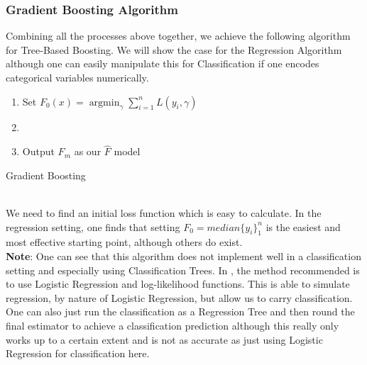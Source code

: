 \documentclass[11pt,a4paper]{report}
\DeclareMathOperator*{\argminB}{argmin}
\begin{document}
\subsubsection{Gradient Boosting Algorithm}
Combining all the processes above together, we achieve the following algorithm for Tree-Based Boosting. 
We will show the case for the Regression Algorithm although one can easily manipulate this for Classification if one encodes categorical variables numerically.
\begin{algorithm}
\SetAlgoLined
\begin{enumerate}
    \item Set $F_0 (x) = \argminB_\gamma \sum_{i=1}^{n} L(y_i, \gamma)$
    
    \item {}
    
    \item Output $F_m$ as our $\hat{F}$ model
\end{enumerate}
\caption{Gradient Boosting}
\end{algorithm}\\
We need to find an initial loss function which is easy to calculate. 
In the regression setting, one finds that setting $F_0 = median \{y_i\}_{1}^{n}$ is the easiest and most effective starting point, although others do exist.
\medskip\\
\textbf{Note}: One can see that this algorithm does not implement well in a classification setting and especially using Classification Trees.
In \cite{gbm}, the method recommended is to use Logistic Regression and log-likelihood functions. 
This is able to simulate regression, by nature of Logistic Regression, but allow us to carry classification.
One can also just run the classification as a Regression Tree and then round the final estimator to achieve a classification prediction although this really only works up to a certain extent and is not as accurate as just using Logistic Regression for classification here.
  
\end{document}
